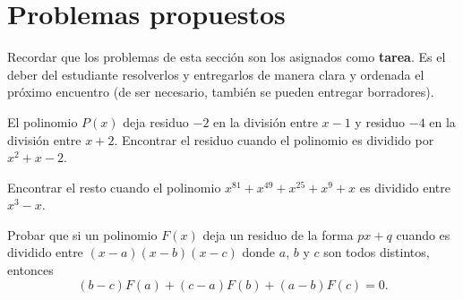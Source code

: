 \section{Problemas propuestos}

Recordar que los problemas de esta sección son los asignados como \textbf{tarea}.
Es el deber del estudiante resolverlos y entregarlos de manera clara y ordenada el próximo encuentro
(de ser necesario, también se pueden entregar borradores).

\begin{section-problem}
    El polinomio $P(x)$ deja residuo $-2$ en la división entre $x - 1$ y residuo $-4$ en la división entre $x + 2$.
    Encontrar el residuo cuando el polinomio es dividido por $x^2 + x - 2$.
\end{section-problem}

\begin{section-problem}
    Encontrar el resto cuando el polinomio $x^{81} + x^{49} + x^{25} + x^9 + x$ es dividido entre $x^3 - x$.
\end{section-problem}

\begin{section-problem}
    Probar que si un polinomio $F(x)$ deja un residuo de la forma $px + q$ cuando es dividido entre $(x - a)(x - b)(x - c)$
    donde $a$, $b$ y $c$ son todos distintos, entonces
    \[(b - c)F(a) + (c - a)F(b) + (a - b)F(c) = 0.\]
\end{section-problem}